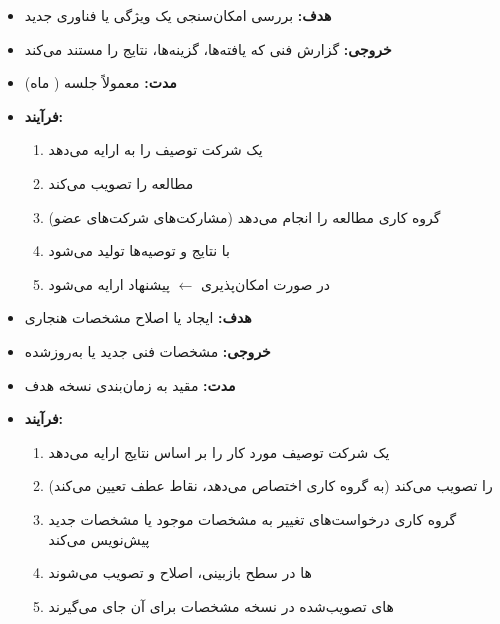 

\CNchained{}



\begin{itemize}
\tightlist
\item
  \textbf{هدف:} بررسی امکان‌سنجی یک ویژگی یا فناوری جدید
\item
  \textbf{خروجی:} گزارش فنی  که یافته‌ها، گزینه‌ها، نتایج را مستند می‌کند
\item
  \textbf{مدت:} معمولاً  جلسه  ( ماه)
\item
  \textbf{فرآیند:}

  \begin{enumerate}
  \def\labelenumi{\arabic{enumi}.}
  \tightlist
  \item
    یک شرکت توصیف  را به  ارایه می‌دهد
  \item
     مطالعه را تصویب می‌کند
  \item
    گروه کاری مطالعه را انجام می‌دهد (مشارکت‌های شرکت‌های عضو)
  \item
     با نتایج و توصیه‌ها تولید می‌شود
  \item
    در صورت امکان‌پذیری \ensuremath{\leftarrow} پیشنهاد  ارایه می‌شود
  \end{enumerate}
\end{itemize}


\begin{itemize}
\tightlist
\item
  \textbf{هدف:} ایجاد یا اصلاح مشخصات هنجاری
\item
  \textbf{خروجی:} مشخصات فنی  جدید یا به‌روزشده
\item
  \textbf{مدت:} مقید به زمان‌بندی نسخه هدف
\item
  \textbf{فرآیند:}

  \begin{enumerate}
  \def\labelenumi{\arabic{enumi}.}
  \tightlist
  \item
    یک شرکت توصیف مورد کار  را بر اساس نتایج  ارایه می‌دهد
  \item
     را تصویب می‌کند (به گروه کاری اختصاص می‌دهد، نقاط عطف تعیین می‌کند)
  \item
    گروه کاری درخواست‌های تغییر  به مشخصات موجود یا مشخصات جدید پیش‌نویس می‌کند
  \item
    ها در سطح  بازبینی، اصلاح و تصویب می‌شوند
  \item
    های تصویب‌شده در نسخه مشخصات برای آن  جای می‌گیرند
  \end{enumerate}
\end{itemize}

